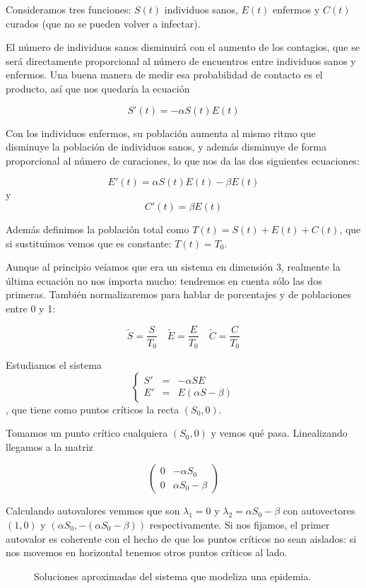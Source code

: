 Consideramos tres funciones: $S(t)$ individuos sanos, $E(t)$ enfermos y $C(t)$ curados (que no se pueden volver a infectar).

El número de individuos sanos disminuirá con el aumento de los contagios, que se será directamente proporcional al número de encuentros entre individuos sanos y enfermos. Una buena manera de medir esa probabilidad de contacto es el producto, así que nos quedaría la ecuación

\[ S'(t) = -αS(t) E(t) \]

Con los individuos enfermos, su población aumenta al mismo ritmo que disminuye la población de individuos sanos, y además disminuye de forma proporcional al número de curaciones, lo que nos da las dos siguientes ecuaciones:

\[ E'(t) = α S(t) E(t) - βE(t) \] y \[ C'(t) = βE(t) \]

Además definimos la población total como $T(t) = S(t) + E(t) + C(t)$, que si sustituimos vemos que es constante: $T(t) = T_0$.

Aunque al principio veíamos que era un sistema en dimensión 3, realmente la última ecuación no nos importa mucho: tendremos en cuenta sólo las dos primeras. También normalizaremos para hablar de porcentajes y de poblaciones entre 0 y 1:

\[ \tilde{S} = \frac{S}{T_0} \quad \tilde{E} = \frac{E}{T_0} \quad \tilde{C} = \frac{C}{T_0} \]

Estudiamos el sistema \[ \left\{\begin{array}{rcl} S' &=& -αSE \\ E' &=& E(αS - β) \end{array}\right. \], que tiene como puntos críticos la recta $(S_0, 0)$.

Tomamos un punto crítico cualquiera $(S_0,0)$ y vemos qué pasa. Linealizando llegamos a la matriz

\[ \begin{pmatrix}
0 & -αS_0 \\ 0 & αS_0 -β
\end{pmatrix} \]

Calculando autovalores vemmos que son $λ_1 = 0$ y $λ_2 = αS_0 - β$ con autovectores $(1,0)$ y $(αS_0, -(αS_0 - β))$ respectivamente. Si nos fijamos, el primer autovalor es coherente con el hecho de que los puntos críticos no sean aislados: si nos movemos en horizontal tenemos otros puntos críticos al lado.

\begin{figure}[hbtp]
\centering
{}
\label{img8-Epidemia}
\caption{Soluciones aproximadas del sistema que modeliza una epidemia.}
\end{figure}

